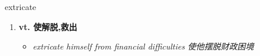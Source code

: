 
\begin{frame}
{\huge extricate}
\begin{center}
\begin{enumerate}\Large
  \item \textbf{vt. 使解脱,救出}
  \begin{itemize}
    \item \em{\Large{extricate himself from financial difficulties 使他摆脱财政困境}}
  \end{itemize}
\end{enumerate}
\end{center}
\end{frame}
